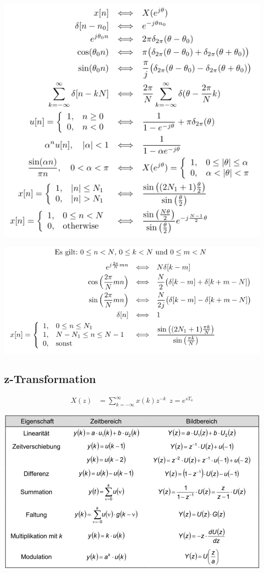 \documentclass[10pt,a4paper]{article}
\begin{document}
  \begin{center}
      \includegraphics[width=.35\textwidth]{./img/dtft.png}
  \end{center}
  \begin{center}
      \includegraphics[width=.35\textwidth]{./img/dft.png}
  \end{center}
  \subsection{z-Transformation}
  \begin{mdframed}[style=exercise]
    \begin{align}
        X(z) &=\sum_{k=-\infty}^{\infty} x(k)z^{-k} \ \ z=e^{s T_a}
    \end{align}
  \end{mdframed}
  \begin{center}
      \includegraphics[width=.35\textwidth]{./img/z.png}
  \end{center}
\end{document}
